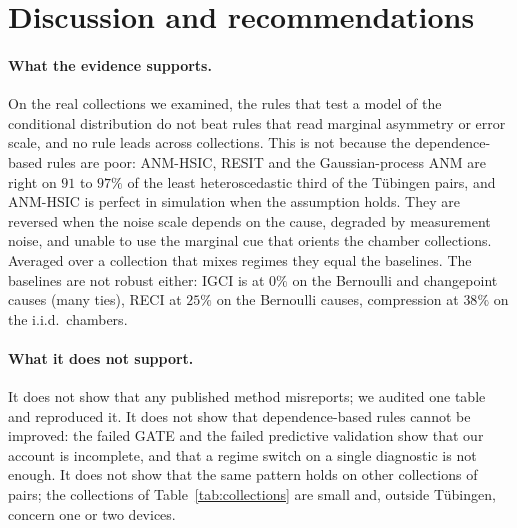 \section{Discussion and recommendations}\label{sec:discussion}

\paragraph{What the evidence supports.} On the real collections we examined, the rules that test a model of the conditional distribution do not beat rules that read marginal asymmetry or error scale, and no rule leads across collections. This is not because the dependence-based rules are poor: ANM-HSIC, RESIT and the Gaussian-process ANM are right on $91$ to $97\%$ of the least heteroscedastic third of the T\"ubingen pairs, and ANM-HSIC is perfect in simulation when the assumption holds. They are reversed when the noise scale depends on the cause, degraded by measurement noise, and unable to use the marginal cue that orients the chamber collections. Averaged over a collection that mixes regimes they equal the baselines. The baselines are not robust either: IGCI is at $0\%$ on the Bernoulli and changepoint causes (many ties), RECI at $25\%$ on the Bernoulli causes, compression at $38\%$ on the i.i.d.\ chambers.

\paragraph{What it does not support.} It does not show that any published method misreports; we audited one table and reproduced it. It does not show that dependence-based rules cannot be improved: the failed GATE and the failed predictive validation show that our account is incomplete, and that a regime switch on a single diagnostic is not enough. It does not show that the same pattern holds on other collections of pairs; the collections of Table~\ref{tab:collections} are small and, outside T\"ubingen, concern one or two devices.

